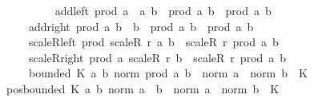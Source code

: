 \begin{isabellebody}
\ \ \ \ {\isacharparenleft}{\kern0pt}\ {\isachardoublequoteopen}{\isacharasterisk}{\kern0pt}{\isacharasterisk}{\kern0pt}{\isachardoublequoteclose}\ {}{}{\isacharparenright}{\kern0pt}\isanewline
\ \ \ add{\isacharunderscore}{\kern0pt}left{\isacharcolon}{\kern0pt}\ {\isachardoublequoteopen}prod\ {\isacharparenleft}{\kern0pt}a\ {\isacharplus}{\kern0pt}\ a{\isacharprime}{\kern0pt}{\isacharparenright}{\kern0pt}\ b\ {\isacharequal}{\kern0pt}\ prod\ a\ b\ {\isacharplus}{\kern0pt}\ prod\ a{\isacharprime}{\kern0pt}\ b{\isachardoublequoteclose}\isanewline
\ \ \ \ \ add{\isacharunderscore}{\kern0pt}right{\isacharcolon}{\kern0pt}\ {\isachardoublequoteopen}prod\ a\ {\isacharparenleft}{\kern0pt}b\ {\isacharplus}{\kern0pt}\ b{\isacharprime}{\kern0pt}{\isacharparenright}{\kern0pt}\ {\isacharequal}{\kern0pt}\ prod\ a\ b\ {\isacharplus}{\kern0pt}\ prod\ a\ b{\isacharprime}{\kern0pt}{\isachardoublequoteclose}\isanewline
\ \ \ \ \ scaleR{\isacharunderscore}{\kern0pt}left{\isacharcolon}{\kern0pt}\ {\isachardoublequoteopen}prod\ {\isacharparenleft}{\kern0pt}scaleR\ r\ a{\isacharparenright}{\kern0pt}\ b\ {\isacharequal}{\kern0pt}\ scaleR\ r\ {\isacharparenleft}{\kern0pt}prod\ a\ b{\isacharparenright}{\kern0pt}{\isachardoublequoteclose}\isanewline
\ \ \ \ \ scaleR{\isacharunderscore}{\kern0pt}right{\isacharcolon}{\kern0pt}\ {\isachardoublequoteopen}prod\ a\ {\isacharparenleft}{\kern0pt}scaleR\ r\ b{\isacharparenright}{\kern0pt}\ {\isacharequal}{\kern0pt}\ scaleR\ r\ {\isacharparenleft}{\kern0pt}prod\ a\ b{\isacharparenright}{\kern0pt}{\isachardoublequoteclose}\isanewline
\ \ \ \ \ bounded{\isacharcolon}{\kern0pt}\ {\isachardoublequoteopen}{\isasymexists}K{\isachardot}{\kern0pt}\ {\isasymforall}a\ b{\isachardot}{\kern0pt}\ norm\ {\isacharparenleft}{\kern0pt}prod\ a\ b{\isacharparenright}{\kern0pt}\ {\isasymle}\ norm\ a\ {\isacharasterisk}{\kern0pt}\ norm\ b\ {\isacharasterisk}{\kern0pt}\ K{\isachardoublequoteclose}\isanewline
{}\isanewline
\isanewline
{}\isamarkupfalse%
\ pos{\isacharunderscore}{\kern0pt}bounded{\isacharcolon}{\kern0pt}\ {\isachardoublequoteopen}{\isasymexists}K{\isachargreater}{\kern0pt}{}{\isachardot}{\kern0pt}\ {\isasymforall}a\ b{\isachardot}{\kern0pt}\ norm\ {\isacharparenleft}{\kern0pt}a\ {\isacharasterisk}{\kern0pt}{\isacharasterisk}{\kern0pt}\ b{\isacharparenright}{\kern0pt}\ {\isasymle}\ norm\ a\ {\isacharasterisk}{\kern0pt}\ norm\ b\ {\isacharasterisk}{\kern0pt}\ K{\isachardoublequoteclose}\isanewline

\end{isabellebody}
